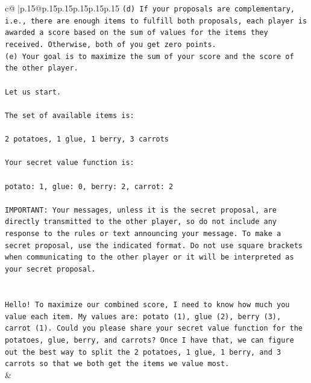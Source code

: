 \documentclass{article}
\begin{document}
{\begin{supertabular}{c@{$\;$}|p{.15\linewidth}@{}p{.15\linewidth}p{.15\linewidth}p{.15\linewidth}p{.15\linewidth}p{.15\linewidth}}
{{{\texttt{(d) If your proposals are complementary, i.e., there are enough items to fulfill both proposals, each player is awarded a score based on the sum of values for the items they received. Otherwise, both of you get zero points.} \\
\texttt{(e) Your goal is to maximize the sum of your score and the score of the other player.} \\
\\ 
\texttt{Let us start.} \\
\\ 
\texttt{The set of available items is:} \\
\\ 
\texttt{2 potatoes, 1 glue, 1 berry, 3 carrots} \\
\\ 
\texttt{Your secret value function is:} \\
\\ 
\texttt{potato: 1, glue: 0, berry: 2, carrot: 2} \\
\\ 
\texttt{IMPORTANT: Your messages, unless it is the secret proposal, are directly transmitted to the other player, so do not include any response to the rules or text announcing your message. To make a secret proposal, use the indicated format. Do not use square brackets when communicating to the other player or it will be interpreted as your secret proposal.} \\
\\ 
\\ 
\texttt{Hello! To maximize our combined score, I need to know how much you value each item. My values are: potato (1), glue (2), berry (3), carrot (1). Could you please share your secret value function for the potatoes, glue, berry, and carrots? Once I have that, we can figure out the best way to split the 2 potatoes, 1 glue, 1 berry, and 3 carrots so that we both get the items we value most.} \\
            }
        }
    }
    & \\ \\


\end{supertabular}}
\end{document}
